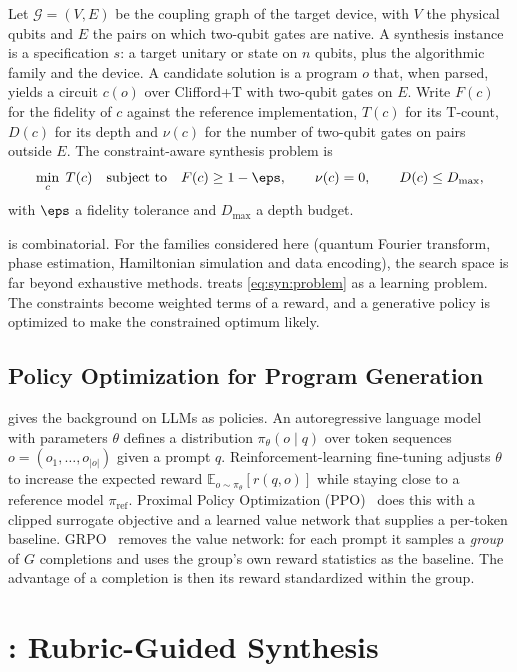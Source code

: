 Let $\mathcal{G}=(V,E)$ be the coupling graph of the target device, with $V$ the physical qubits and $E$ the pairs on which two-qubit gates are native. A synthesis instance is a specification $s$: a target unitary or state on $n$ qubits, plus the algorithmic family and the device. A candidate solution is a program $o$ that, when parsed, yields a circuit $c(o)$ over Clifford+T with two-qubit gates on $E$. Write $F(c)$ for the fidelity of $c$ against the reference implementation, $T(c)$ for its T-count, $D(c)$ for its depth and $\nu(c)$ for the number of two-qubit gates on pairs outside $E$. The constraint-aware synthesis problem is
\begin{equation}\label{eq:syn:problem}
  \min_{c}\; T(c) \quad\text{subject to}\quad F(c)\ge 1-\eps,\qquad \nu(c)=0,\qquad D(c)\le D_{\max},
\end{equation}
with $\eps$ a fidelity tolerance and $D_{\max}$ a depth budget.

 is combinatorial. For the families considered here (quantum Fourier transform, phase estimation, Hamiltonian simulation and data encoding), the search space is far beyond exhaustive methods. \rubriq{} treats \cref{eq:syn:problem} as a learning problem. The constraints become weighted terms of a reward, and a generative policy is optimized to make the constrained optimum likely.

\subsection{Policy Optimization for Program Generation}\label{sec:syn:po}

 gives the background on LLMs as policies. An autoregressive language model with parameters $\theta$ defines a distribution $\pi_\theta(o\mid q)$ over token sequences $o=(o_1,\dots,o_{|o|})$ given a prompt $q$. Reinforcement-learning fine-tuning adjusts $\theta$ to increase the expected reward $\mathbb{E}_{o\sim\pi_\theta}[r(q,o)]$ while staying close to a reference model $\pi_{\mathrm{ref}}$. Proximal Policy Optimization (PPO)~\cite{schulman2017ppo} does this with a clipped surrogate objective and a learned value network that supplies a per-token baseline. GRPO~\cite{shao2024deepseekmath} removes the value network: for each prompt it samples a \emph{group} of $G$ completions and uses the group's own reward statistics as the baseline. The advantage of a completion is then its reward standardized within the group.

\section{\rubriq{}: Rubric-Guided Synthesis}\label{sec:syn:rubriq}

